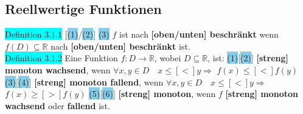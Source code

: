 \documentclass[landscape, 10pt]{article}
\newcommand{\R}{\mathbb{R}}
\begin{document}
\begin{multicols}{3}
       \subsection{Reellwertige Funktionen}
              \colorbox{cyan}{Definition 3.1.1} 
                     [\colorbox{SkyBlue}{(1)}/\colorbox{SkyBlue}{(2)}]
                     \colorbox{SkyBlue}{(3)} $f$ ist nach 
                     \textbf{[oben/unten] beschränkt} wenn 
                     \textcolor{NavyBlue}{$f(D)\subseteq\R$} 
                     nach \textbf{[oben/unten] beschränkt} ist.\\
              \colorbox{cyan}{Definition 3.1.2} 
                     Eine Funktion $f:D\longrightarrow\R$, wobei 
                     $D\subseteq\R$, ist:
                     \colorbox{SkyBlue}{(1)}[\colorbox{SkyBlue}{(2)}] 
                     \textbf{[streng] monoton 
                     wachsend}, wenn \textcolor{NavyBlue}{
                     $\forall x,y\in D\quad x\leqslant [<]y\Rightarrow$
                     $f(x)\leqslant [<]f(y)$} 
                     \colorbox{SkyBlue}{(3)}[\colorbox{SkyBlue}{(4)}] 
                     \textbf{[streng] monoton 
                     fallend}, wenn \textcolor{NavyBlue}{
                     $\forall x,y\in D\quad x\leqslant [<]y\Rightarrow$
                     $f(x)\geqslant [>]f(y)$} 
                     \colorbox{SkyBlue}{(5)}[\colorbox{SkyBlue}{(6)}] 
                     \textbf{[streng] monoton}, 
                     wenn \textcolor{NavyBlue}{$f$} 
                     \textbf{[streng] monoton wachsend} oder 
                     \textbf{fallend} ist.\\

\end{multicols}
\end{document}
